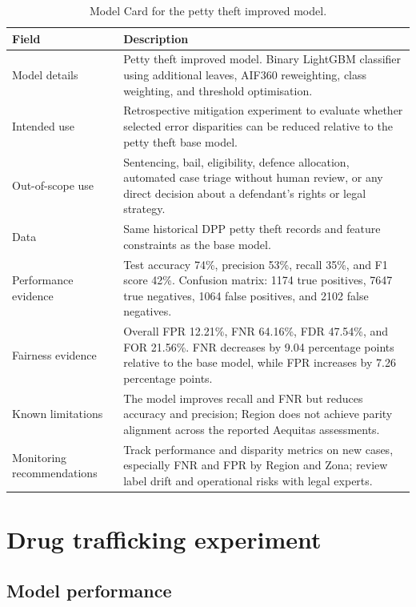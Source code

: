 \documentclass[fleqn,10pt]{wlscirep}
\begin{document}
\begin{table}[!htb]
\centering
\begin{tabular}{|p{3.5cm}|p{11cm}|}
\hline
\textbf{Field} & \textbf{Description} \\ \hline
Model details & Petty theft improved model. Binary LightGBM classifier using additional leaves, AIF360 reweighting, class weighting, and threshold optimisation. \\ \hline
Intended use & Retrospective mitigation experiment to evaluate whether selected error disparities can be reduced relative to the petty theft base model. \\ \hline
Out-of-scope use & Sentencing, bail, eligibility, defence allocation, automated case triage without human review, or any direct decision about a defendant's rights or legal strategy. \\ \hline
Data & Same historical DPP petty theft records and feature constraints as the base model. \\ \hline
Performance evidence & Test accuracy 74\%, precision 53\%, recall 35\%, and F1 score 42\%. Confusion matrix: 1174 true positives, 7647 true negatives, 1064 false positives, and 2102 false negatives. \\ \hline
Fairness evidence & Overall FPR 12.21\%, FNR 64.16\%, FDR 47.54\%, and FOR 21.56\%. FNR decreases by 9.04 percentage points relative to the base model, while FPR increases by 7.26 percentage points. \\ \hline
Known limitations & The model improves recall and FNR but reduces accuracy and precision; Region does not achieve parity alignment across the reported Aequitas assessments. \\ \hline
Monitoring recommendations & Track performance and disparity metrics on new cases, especially FNR and FPR by Region and Zona; review label drift and operational risks with legal experts. \\ \hline
\end{tabular}
\caption{Model Card for the petty theft improved model.}
\label{tab:model_card_pt_improved}
\end{table}

\clearpage

\section{Drug trafficking experiment}

\subsection{Model performance}
\end{document}
